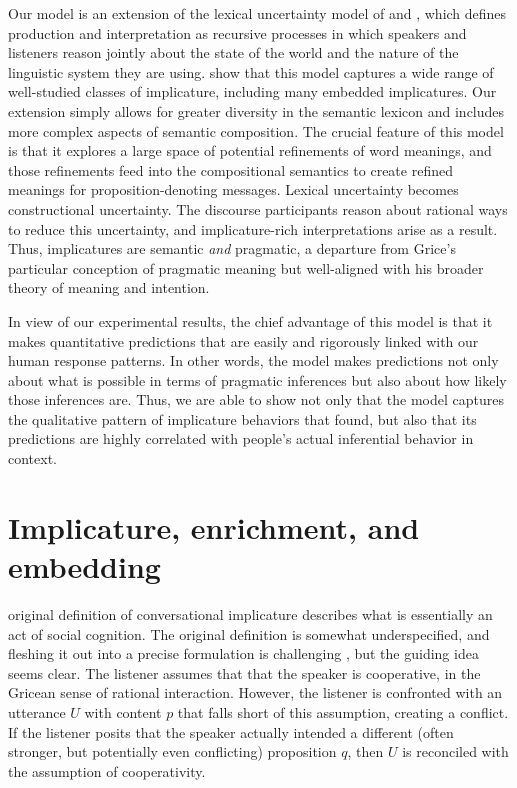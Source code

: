 \documentclass[leqno]{article}
\begin{document}
Our model is an extension of the lexical uncertainty model of
\citet{Bergen:Goodman:Levy:2012} and \citet{Bergen:Levy:Goodman:2014},
which defines production and interpretation as recursive processes in
which speakers and listeners reason jointly about the state of the
world and the nature of the linguistic system they are
using. \citeauthor{Bergen:Levy:Goodman:2014} show that this model
captures a wide range of well-studied classes of implicature,
including many embedded implicatures. Our extension simply allows for
greater diversity in the semantic lexicon and includes more complex
aspects of semantic composition.  The crucial feature of this model is
that it explores a large space of potential refinements of word
meanings, and those refinements feed into the compositional semantics
to create refined meanings for proposition-denoting messages. Lexical
uncertainty becomes constructional uncertainty. The discourse
participants reason about rational ways to reduce this uncertainty,
and implicature-rich interpretations arise as a result. Thus,
implicatures are semantic \emph{and} pragmatic, a departure from
Grice's particular conception of pragmatic meaning but well-aligned
with his broader theory of meaning and intention.



In view of our experimental results, the chief advantage of this model
is that it makes quantitative predictions that are easily and
rigorously linked with our human response patterns. In other words,
the model makes predictions not only about what is possible in terms
of pragmatic inferences but also about how likely those inferences
are. Thus, we are able to show not only that the model captures the
qualitative pattern of implicature behaviors that
\citeauthor{Chemla:Spector:2011} found, but also that its predictions
are highly correlated with people's actual inferential behavior in
context.


\section{Implicature, enrichment, and embedding }\label{sec:implicature}

 original definition of conversational implicature
describes what is essentially an act of social cognition. The original
definition is somewhat underspecified, and fleshing it out into a
precise formulation is challenging \citep{Hirschberg85}, but the
guiding idea seems clear.  The listener assumes that that the speaker
is cooperative, in the Gricean sense of rational interaction. However,
the listener is confronted with an utterance $U$ with content $p$ that
falls short of this assumption, creating a conflict. If the listener
posits that the speaker actually intended a different (often stronger,
but potentially even conflicting) proposition $q$, then $U$ is
reconciled with the assumption of cooperativity.
\end{document}
